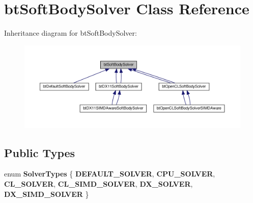 \hypertarget{classbtSoftBodySolver}{}\section{bt\+Soft\+Body\+Solver Class Reference}
\label{classbtSoftBodySolver}


Inheritance diagram for bt\+Soft\+Body\+Solver\+:
\nopagebreak
\begin{figure}[H]
\begin{center}
\leavevmode
\includegraphics[width=350pt]{classbtSoftBodySolver__inherit__graph}
\end{center}
\end{figure}
\subsection*{Public Types}
\begin{DoxyCompactItemize}
\item 
\mbox{\label{classbtSoftBodySolver_ae50676e1c9c6cdb0e3e59bd426baf540}} 
enum {\bfseries Solver\+Types} \{ \newline
{\bfseries D\+E\+F\+A\+U\+L\+T\+\_\+\+S\+O\+L\+V\+ER}, 
{\bfseries C\+P\+U\+\_\+\+S\+O\+L\+V\+ER}, 
{\bfseries C\+L\+\_\+\+S\+O\+L\+V\+ER}, 
{\bfseries C\+L\+\_\+\+S\+I\+M\+D\+\_\+\+S\+O\+L\+V\+ER}, 
\newline
{\bfseries D\+X\+\_\+\+S\+O\+L\+V\+ER}, 
{\bfseries D\+X\+\_\+\+S\+I\+M\+D\+\_\+\+S\+O\+L\+V\+ER}
 \}
\end{DoxyCompactItemize}
